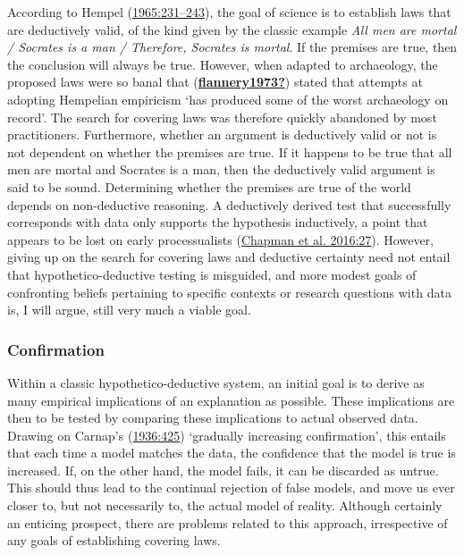 \documentclass[
  a4paper,
  oneside]{uiophdthesis}
\begin{document}
According to Hempel (\protect\hyperlink{ref-hempel1965}{1965:231--243}), the goal of science is to establish laws that are deductively valid, of the kind given by the classic example \emph{All men are mortal / Socrates is a man / Therefore, Socrates is mortal}. If the premises are true, then the conclusion will always be true. However, when adapted to archaeology, the proposed laws were so banal that (\protect\hyperlink{ref-flannery1973}{\textbf{flannery1973?}}) stated that attempts at adopting Hempelian empiricism `has produced some of the worst archaeology on record'. The search for covering laws was therefore quickly abandoned by most practitioners. Furthermore, whether an argument is deductively valid or not is not dependent on whether the premises are true. If it happens to be true that all men are mortal and Socrates is a man, then the deductively valid argument is said to be sound. Determining whether the premises are true of the world depends on non-deductive reasoning. A deductively derived test that successfully corresponds with data only supports the hypothesis inductively, a point that appears to be lost on early processualists (\protect\hyperlink{ref-chapman2016}{Chapman et al. 2016:27}). However, giving up on the search for covering laws and deductive certainty need not entail that hypothetico-deductive testing is misguided, and more modest goals of confronting beliefs pertaining to specific contexts or research questions with data is, I will argue, still very much a viable goal.

\hypertarget{confirmation}{%
\subsubsection{Confirmation}\label{confirmation}}

Within a classic hypothetico-deductive system, an initial goal is to derive as many empirical implications of an explanation as possible. These implications are then to be tested by comparing these implications to actual observed data. Drawing on Carnap's (\protect\hyperlink{ref-carnap1936}{1936:425}) `gradually increasing confirmation', this entails that each time a model matches the data, the confidence that the model is true is increased. If, on the other hand, the model fails, it can be discarded as untrue. This should thus lead to the continual rejection of false models, and move us ever closer to, but not necessarily to, the actual model of reality. Although certainly an enticing prospect, there are problems related to this approach, irrespective of any goals of establishing covering laws.
\end{document}
